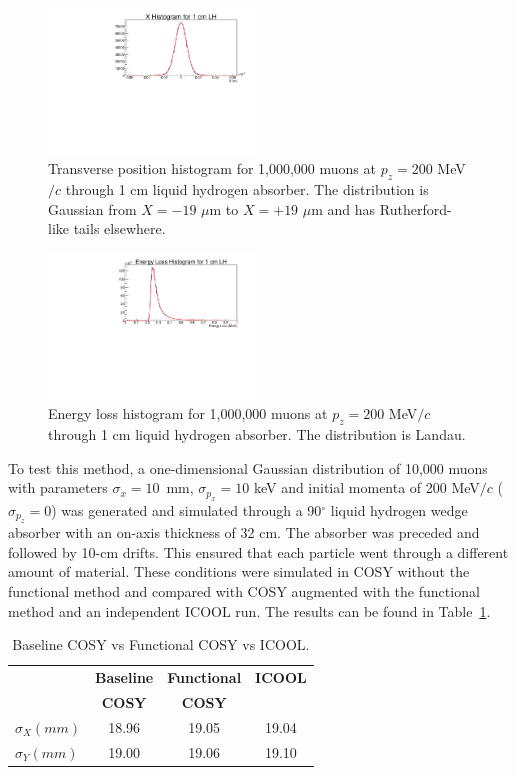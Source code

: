 \documentclass{jacow}
\begin{document}
\begin{figure}[htf]
\centering
\includegraphics[width=0.49\textwidth]{figures/scattering_curve.pdf}
\caption{Transverse position histogram for 1,000,000 muons at $p_z = 200$ MeV$/c$ through 1 cm liquid hydrogen absorber. The distribution is Gaussian from $X=-19$ $\mu$m to $X =+19$ $\mu$m and has Rutherford-like tails elsewhere.}
\label{fig:scattering_curve}
\end{figure}

\begin{figure}[htf]
\centering
\includegraphics[width=0.49\textwidth]{figures/straggling_curve.pdf}
\caption{Energy loss histogram for 1,000,000 muons at $p_z = 200$ MeV$/c$ through 1 cm liquid hydrogen absorber. The distribution is Landau.}
\label{fig:straggling_curve}
\end{figure}

To test this method, a one-dimensional Gaussian distribution of 10,000 muons with parameters $\sigma_x=10$~mm, $\sigma_{p_x}=10$ keV and initial momenta of 200 MeV$/c$ ($\sigma_{p_z} = 0$) was generated and simulated through a 90$^\circ$ liquid hydrogen wedge absorber with an on-axis thickness of 32 cm. The absorber was preceded and followed by 10-cm drifts. This ensured that each particle went through a different amount of material. These conditions were simulated in COSY without the functional method and compared with COSY augmented with the functional method and an independent ICOOL run. The results can be found in Table~\ref{tab:comparison}.

\begin{table}[hbt]
   \centering
   \caption{Baseline COSY vs Functional COSY vs ICOOL.}
   \begin{tabular}{lccc}
       \toprule
	\textbf{}& \textbf{Baseline} & \textbf{Functional}& \textbf{ICOOL} \\ 
	\textbf{}& \textbf{COSY} & \textbf{COSY}& \textbf{} \\ 
          $ \sigma_X (mm)$&18.96&19.05&19.04\\
	$\sigma_Y (mm)$&19.00&19.06&19.10\\
	\bottomrule
   \end{tabular}
   \label{tab:comparison}
\end{table}
\end{document}
